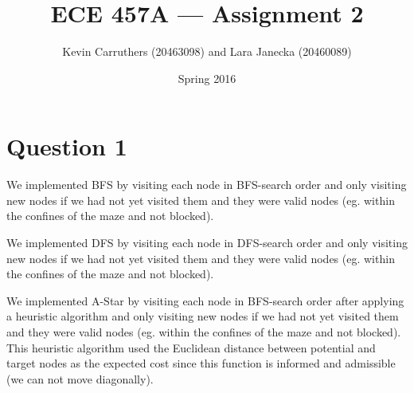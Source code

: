 \documentclass[12pt]{article}
\begin{document}
\title{ECE 457A --- Assignment 2}
\author{Kevin Carruthers (20463098) and Lara Janecka (20460089)}
\date{\vspace{-2ex}Spring 2016}
\maketitle\HRule

\section*{Question 1}
We implemented BFS by visiting each node in BFS-search order and only visiting new nodes if we had not yet visited them and they were valid nodes (eg. within the confines of the maze and not blocked).

We implemented DFS by visiting each node in DFS-search order and only visiting new nodes if we had not yet visited them and they were valid nodes (eg. within the confines of the maze and not blocked).

We implemented A-Star by visiting each node in BFS-search order after applying a heuristic algorithm and only visiting new nodes if we had not yet visited them and they were valid nodes (eg. within the confines of the maze and not blocked). This heuristic algorithm used the Euclidean distance between potential and target nodes as the expected cost since this function is informed and admissible (we can not move diagonally).
\end{document}
